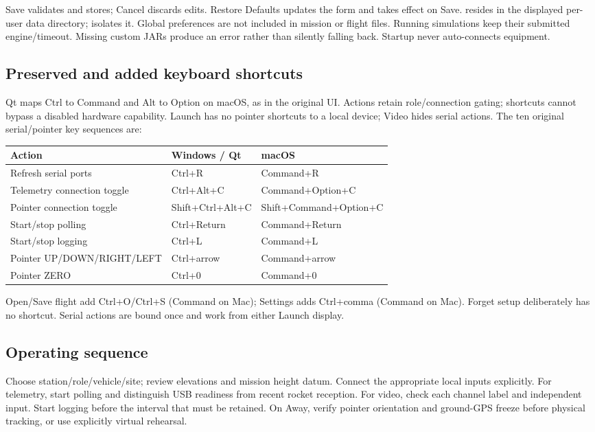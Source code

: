 Save validates and stores; Cancel discards edits. Restore Defaults updates the
form and takes effect on Save.  resides in the displayed
per-user data directory;  isolates it. Global preferences are
not included in mission or flight files. Running simulations keep their
submitted engine/timeout. Missing custom JARs produce an error rather than
silently falling back. Startup never auto-connects equipment.

\subsection{Preserved and added keyboard shortcuts}
Qt maps Ctrl to Command and Alt to Option on macOS, as in the original UI.
Actions retain role/connection gating; shortcuts cannot bypass a disabled
hardware capability. Launch has no pointer shortcuts to a local device; Video
hides serial actions. The ten original serial/pointer key sequences are:
\begin{longtable}{@{}L{.36\linewidth}L{.28\linewidth}L{.29\linewidth}@{}}
\toprule Action & Windows / Qt & macOS \\\midrule\endhead
Refresh serial ports & Ctrl+R & Command+R \\
Telemetry connection toggle & Ctrl+Alt+C & Command+Option+C \\
Pointer connection toggle & Shift+Ctrl+Alt+C & Shift+Command+Option+C \\
Start/stop polling & Ctrl+Return & Command+Return \\
Start/stop logging & Ctrl+L & Command+L \\
Pointer UP/DOWN/RIGHT/LEFT & Ctrl+arrow & Command+arrow \\
Pointer ZERO & Ctrl+0 & Command+0 \\
\bottomrule
\end{longtable}
Open/Save flight add Ctrl+O/Ctrl+S (Command on Mac); Settings adds Ctrl+comma
(Command on Mac). Forget setup deliberately has no shortcut. Serial actions
are bound once and work from either Launch display.

\subsection{Operating sequence}
Choose station/role/vehicle/site; review elevations and mission height datum.
Connect the appropriate local inputs explicitly. For telemetry, start polling
and distinguish USB readiness from recent rocket reception. For video, check
each channel label and independent input. Start logging before the interval
that must be retained. On Away, verify pointer orientation and ground-GPS freeze
before physical tracking, or use explicitly virtual rehearsal.

